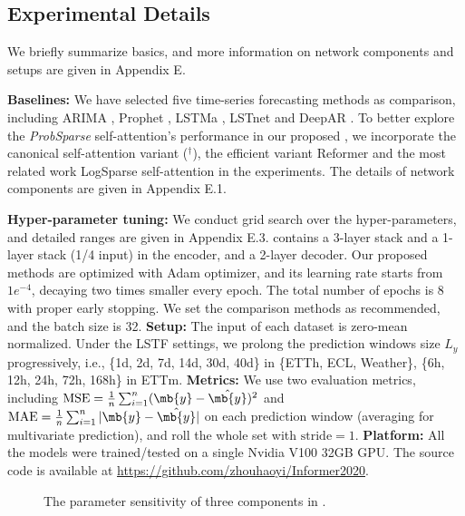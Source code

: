 \subsection{Experimental Details}
We briefly summarize basics, and more information on network components and setups are given in Appendix E.

\textbf{Baselines:}
We have selected five time-series forecasting methods as comparison, including ARIMA \cite{ariyo2014stock}, Prophet \cite{taylor2018forecasting}, LSTMa \cite{bahdanau2014neural}, LSTnet \cite{lai2018modeling} and DeepAR \cite{flunkert2017deepar}. To better explore the \emph{ProbSparse} self-attention's performance in our proposed {\mn}, we incorporate the canonical self-attention variant (\mn$^{\dag}$), the efficient variant Reformer \cite{kitaev2019reformer} and the most related work LogSparse self-attention \cite{li2019enhancing} in the experiments.
The details of network components are given in Appendix E.1. 

\textbf{Hyper-parameter tuning:}
We conduct grid search over the hyper-parameters, and detailed ranges are given in Appendix E.3. {\mn} contains a 3-layer stack and a 1-layer stack (1/4 input) in the encoder, and a 2-layer decoder. Our proposed methods are optimized with Adam optimizer, and its learning rate starts from $1e^{-4}$, decaying two times smaller every epoch. The total number of epochs is 8 with proper early stopping. We set the comparison methods as recommended, and the batch size is 32.
\textbf{Setup:}
The input of each dataset is zero-mean normalized.
Under the LSTF settings, we prolong the prediction windows size $L_y$ progressively, i.e., \{1d, 2d, 7d, 14d, 30d, 40d\} in \{ETTh, ECL, Weather\}, \{6h, 12h, 24h, 72h, 168h\} in ETTm.
\textbf{Metrics:} We use two evaluation metrics, including $\textrm{MSE}=\frac{1}{n}\sum_{i=1}^{n}(\mb{y}-\hat{\mb{y}})^2$ and $\textrm{MAE}=\frac{1}{n}\sum_{i=1}^{n}|\mb{y}-\hat{\mb{y}}|$ on each prediction window (averaging for multivariate prediction), and roll the whole set with $\textrm{stride}=1$.
\textbf{Platform:} All the models were trained/tested on a single Nvidia V100 32GB GPU. The source code is available at \url{https://github.com/zhouhaoyi/Informer2020}.

\begin{figure*}[t]
\centering
    \hfill
    \hfill
\caption{The parameter sensitivity of three components in \mn. \qquad\qquad~~~}
\label{fig:sensi}
\end{figure*}

